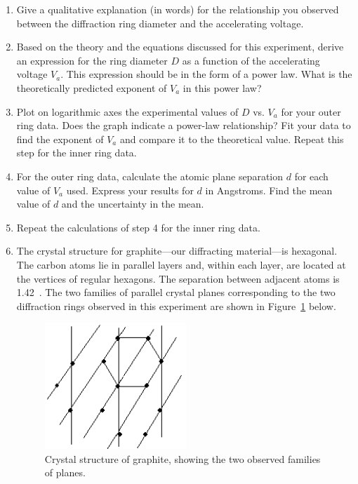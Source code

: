 \begin{enumerate}
\item Give a qualitative explanation (in words) for the relationship you
  observed between the diffraction ring diameter and the accelerating
  voltage.

\item Based on the theory and the equations discussed for this experiment,
  derive an expression for the ring diameter $D$ as a function of the
  accelerating voltage $V_a$. This expression should be in the form of a power
  law.  What is the theoretically predicted exponent of $V_a$ in this power law?

\item Plot on logarithmic axes the experimental values of $D$ vs.  $V_a$ for
  your outer ring data. Does the graph indicate a power-law relationship? Fit
  your data to find the exponent of $V_a$ and compare it to the theoretical
  value. Repeat this step for the inner ring data.

\item For the outer ring data, calculate the atomic plane separation $d$ for
  each value of $V_a$ used. Express your results for $d$ in
  Angstroms. Find
  the mean value of $d$ and the uncertainty in the mean. 

\item Repeat the calculations of step 4 for the inner ring data. 

\item The crystal structure for graphite---our diffracting material---is
  hexagonal. The carbon atoms lie in parallel layers and, within each layer, are
  located at the vertices of regular hexagons.  The separation between adjacent
  atoms is 1.42~\angstrom.  The two families of parallel crystal planes
  corresponding to the two diffraction rings observed in this experiment are
  shown in Figure~\ref{fig:graphite} below.
\begin{figure}
\begin{centering}
\includegraphics[width=2.1in]{../images/ediffraction-img3.png} 
\caption{Crystal structure of graphite, showing the two observed families of
  planes.} 
\label{fig:graphite}
\end{centering}
\end{figure}


\end{enumerate}
